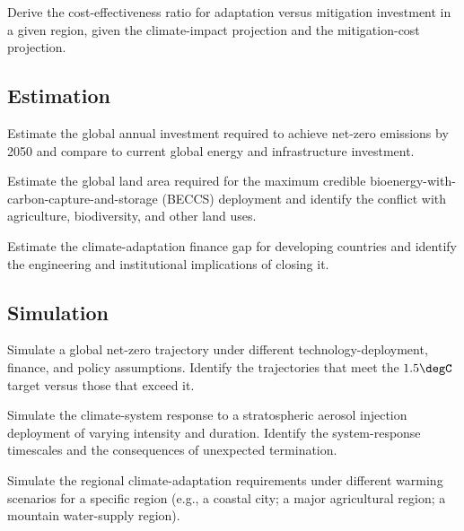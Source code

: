 \begin{exercise}
Derive the cost-effectiveness ratio for adaptation versus mitigation investment in a given region, given the climate-impact projection and the mitigation-cost projection.
\end{exercise}

\subsection*{Estimation}

\begin{exercise}
Estimate the global annual investment required to achieve net-zero emissions by 2050 and compare to current global energy and infrastructure investment.
\end{exercise}

\begin{exercise}
Estimate the global land area required for the maximum credible bioenergy-with-carbon-capture-and-storage (BECCS) deployment and identify the conflict with agriculture, biodiversity, and other land uses.
\end{exercise}

\begin{exercise}
Estimate the climate-adaptation finance gap for developing countries and identify the engineering and institutional implications of closing it.
\end{exercise}

\subsection*{Simulation}

\begin{exercise}
Simulate a global net-zero trajectory under different technology-deployment, finance, and policy assumptions. Identify the trajectories that meet the $1.5\degC$ target versus those that exceed it.
\end{exercise}

\begin{exercise}
Simulate the climate-system response to a stratospheric aerosol injection deployment of varying intensity and duration. Identify the system-response timescales and the consequences of unexpected termination.
\end{exercise}

\begin{exercise}
Simulate the regional climate-adaptation requirements under different warming scenarios for a specific region (e.g., a coastal city; a major agricultural region; a mountain water-supply region).
\end{exercise}

